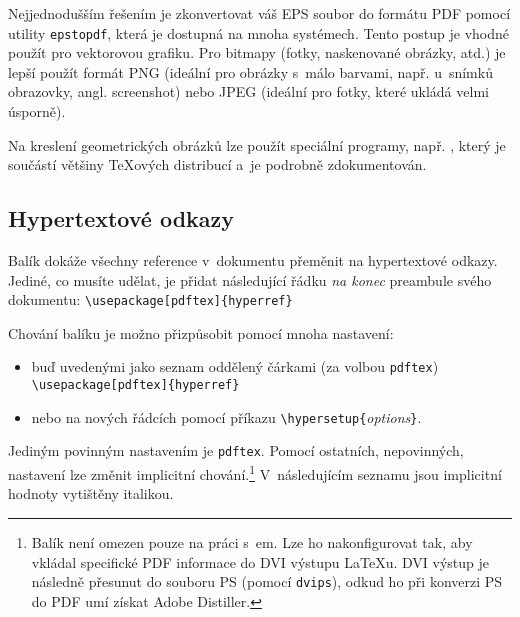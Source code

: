 Nejjednodušším řešením je zkonvertovat váš EPS soubor do formátu
PDF pomocí utility \texttt{epstopdf}, která je dostupná na mnoha
systémech. Tento postup je vhodné použít pro vektorovou grafiku.
Pro bitmapy (fotky, naskenované obrázky, atd.) je lepší
použít formát PNG (ideální pro obrázky s~málo barvami, např.
u~snímků obrazovky, angl. screenshot) nebo JPEG (ideální pro fotky, které ukládá velmi
úsporně).

Na kreslení geometrických obrázků lze použít speciální programy,
např. \MP{}, který je součástí většiny \TeX ových
distribucí a~je podrobně zdokumentován.

\subsection{Hypertextové odkazy}
\label{ssec:pdfhyperref}

Balík  dokáže všechny reference v~dokumentu přeměnit
na hypertextové odkazy. Jediné, co musíte udělat, je přidat následující
řádku \emph{na konec} preambule svého dokumentu:
\verb+\usepackage[pdftex]{hyperref}+

Chování balíku  je možno přizpůsobit pomocí mnoha
nastavení:
\begin{itemize}
\item buď uvedenými jako seznam oddělený čárkami (za volbou \verb+pdftex+) \\
  \verb+\usepackage[pdftex]{hyperref}+
\item nebo na nových řádcích pomocí příkazu
  \verb+\hypersetup{+\emph{options}\verb+}+.
\end{itemize}

Jediným povinným nastavením je \texttt{pdftex}.
Pomocí ostatních, nepovinných, nastavení lze změnit implicitní
chování.\footnote{Balík  není omezen pouze na práci
s~\pdfTeX em. Lze ho nakonfigurovat tak, aby vkládal specifické PDF
informace do DVI výstupu  \LaTeX u. DVI výstup
je následně přesunut do souboru PS (pomocí \texttt{dvips}), odkud
ho při konverzi PS do PDF  umí získat Adobe Distiller.
}
V~následujícím seznamu jsou implicitní hodnoty vytištěny italikou.

